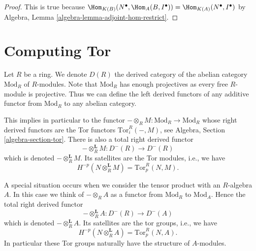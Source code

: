 \begin{proof}
This is true because
$\Hom_{K(B)}(N^\bullet, \Hom_A(B, I^\bullet)) =
\Hom_{K(A)}(N^\bullet, I^\bullet)$
by Algebra, Lemma \ref{algebra-lemma-adjoint-hom-restrict}.
\end{proof}










\section{Computing Tor}
\label{section-computing-tor}

\noindent
Let $R$ be a ring. We denote $D(R)$ the derived category of the
abelian category $\text{Mod}_R$ of $R$-modules. Note that $\text{Mod}_R$
has enough projectives as every free $R$-module is projective.
Thus we can define the left derived functors of any additive functor
from $\text{Mod}_R$ to any abelian category.

\medskip\noindent
This implies in particular to the functor
$ - \otimes_R M : \text{Mod}_R \to \text{Mod}_R$
whose right derived functors are the Tor functors $\text{Tor}_i^R(-, M)$, see
Algebra, Section \ref{algebra-section-tor}.
There is also a total right derived functor
\begin{equation}
\label{equation-derived-tensor-module}
-\otimes_R^{\mathbf{L}} M :
D^{-}(R)
\longrightarrow
D^{-}(R)
\end{equation}
which is denoted $-\otimes_R^{\mathbf{L}} M$. Its satellites are the
Tor modules, i.e., we have
$$
H^{-p}(N \otimes_R^{\mathbf{L}} M) = \text{Tor}_p^R(N, M).
$$

\medskip\noindent
A special situation occurs when we consider the tensor product with
an $R$-algebra $A$. In this case we think of $- \otimes_R A$
as a functor from $\text{Mod}_R$ to $\text{Mod}_A$. Hence the total
right derived functor
\begin{equation}
\label{equation-derived-tensor-algebra}
-\otimes_R^{\mathbf{L}} A :
D^{-}(R)
\longrightarrow
D^{-}(A)
\end{equation}
which is denoted $-\otimes_R^{\mathbf{L}} A$. Its satellites are the
tor groups, i.e., we have
$$
H^{-p}(N \otimes_R^{\mathbf{L}} A) = \text{Tor}_p^R(N, A).
$$
In particular these Tor groups naturally have the structure of $A$-modules.







